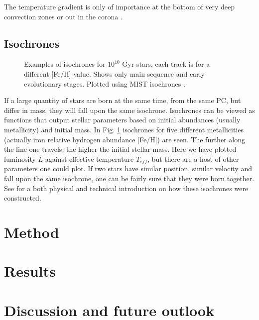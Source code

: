 \documentclass[twocolumn]{aastex62}
\begin{document}
The temperature gradient is only of importance at the bottom of very deep convection zones or out in the corona \citep{Shine}. 

\subsection{Isochrones}

\begin{figure}
\caption{Examples of isochrones for $10^{10}$ Gyr stars, each track is for a different [Fe/H] value. Shows only main sequence and early evolutionary stages. Plotted using MIST isochrones \citep{Dotter}.}
\label{fig:iso_example}
\end{figure}

If a large quantity of stars are born at the same time, from the same PC, but differ in mass, they will fall upon the same isochrone. Isochrones can be viewed as functions that output stellar parameters based on initial abundances (usually metallicity) and initial mass. In Fig. \ref{fig:iso_example} isochrones for five different metallicities (actually iron relative hydrogen abundance [Fe/H]) are seen. The further along the line one travels, the higher the initial stellar mass. Here we have plotted luminosity $L$ against effective temperature $T_{eff}$, but there are a host of other parameters one could plot. If two stars have similar position, similar velocity and fall upon the same isochrone, one can be fairly sure that they were born together. See \cite{Dotter} for a both physical and technical introduction on how these isochrones were constructed.


\section{Method}
\section{Results}
\section{Discussion and future outlook}




\end{document}
